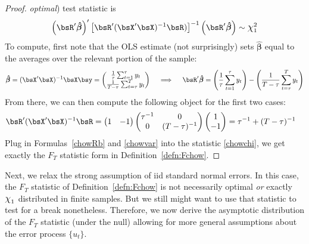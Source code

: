 \documentclass[12pt]{article}
\theoremstyle{plain}
\theoremstyle{definition}
\theoremstyle{remark}
\newcommand*{\Chi}{\mbox{\large$\chi$}} %
\newcommand{\bshatbeta}{\boldsymbol{\hat{\beta}}}
\begin{document}
\begin{proof}
\emph{optimal}) test statistic is
\begin{align}
  \left(\bsR'\bshatbeta\right)'
  \left[\bsR'(\bsX'\bsX)^{-1}\bsR)\right]^{-1}
  \left(\bsR'\bshatbeta\right)
  \sim \Chi_1^2
  \label{chowchi}
\end{align}
To compute, first note that the OLS estimate (not surprisingly) sets
$\bshatbeta$ equal to the averages over the relevant portion of the
sample:
\begin{align}
  \bshatbeta
  =
  (\bsX'\bsX)^{-1}
  \bsX\bsy
  =
  \begin{pmatrix}
    \frac{1}{\tau}\sum_{t=1}^\tau y_t\\
    \frac{1}{T-\tau}\sum_{t=\tau}^Ty_t
  \end{pmatrix}
  \quad\implies\quad
  \bsR'\bshatbeta
  =
  \left(\frac{1}{\tau}\sum_{t=1}^\tau y_t\right)
  -
  \left( \frac{1}{T-\tau}\sum_{t=\tau}^Ty_t \right)
  \label{chowRb}
\end{align}
From there, we can then compute the following object for the first two
cases:
\begin{align}
  \bsR'(\bsX'\bsX)^{-1}\bsR
  &=
  \begin{pmatrix}
    1 & -1
  \end{pmatrix}
  \begin{pmatrix}
    \tau^{-1} & 0 \\
    0 & (T-\tau)^{-1}\\
  \end{pmatrix}
  \begin{pmatrix}
    1 \\ -1
  \end{pmatrix}
  = \tau^{-1} + (T-\tau)^{-1}
  \label{chowvar}
\end{align}
Plug in Formulas~\ref{chowRb} and \ref{chowvar} into the statistic
\ref{chowchi}, we get exactly the $F_T$ statistic form
in Definition~\ref{defn:Fchow}.
\end{proof}

Next, we relax the strong assumption of iid standard normal errors.  In
this case, the $F_T$ statistic of Definition~\ref{defn:Fchow} is not
necessarily optimal \emph{or} exactly $\Chi_1$ distributed in finite
samples.
But we still might want to use that statistic to test for a break
nonetheless.
Therefore, we now derive the asymptotic distribution of the $F_T$
statistic (under the null) allowing for more general assumptions about
the error process $\{u_t\}$.
\end{document}
